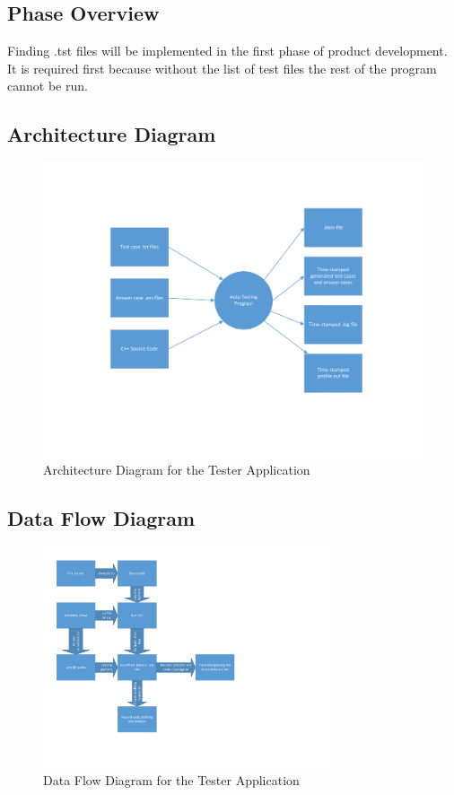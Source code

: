 \subsection{Phase Overview}
Finding .tst files will be implemented in the first phase of product development. It is required first because without the list of test files the rest of the program cannot be run.

\subsection{Architecture  Diagram}
\begin{figure}[H]
\begin{center}
\includegraphics[width=1.0\textwidth]{./ArchitectDiagram}
\end{center}
\caption{Architecture Diagram for the Tester Application \label{arch_generic}}
\end{figure}


\subsection{Data Flow Diagram} 



\begin{figure}[H]
\begin{center}
\includegraphics[width=0.75\textwidth]{./dataflow}
\end{center}
\caption{ Data Flow Diagram for the Tester Application \label{dataflow}}
\end{figure}


